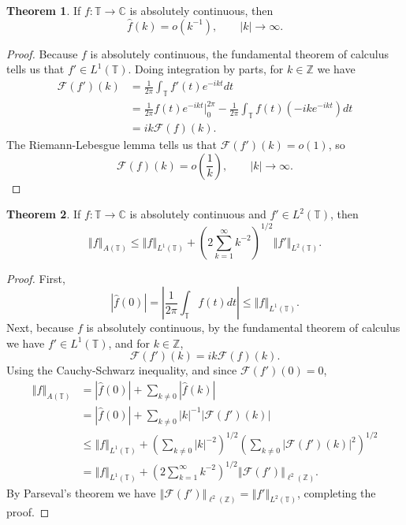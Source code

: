 \documentclass{article}
\newcommand{\norm}[1]{\left\Vert #1 \right\Vert}
\theoremstyle{definition}
\newtheorem{theorem}{Theorem}
\theoremstyle{definition}
\begin{document}
\begin{theorem}
If $f:\mathbb{T} \to \mathbb{C}$ is absolutely continuous, then
\[
\hat{f}(k) = o(k^{-1}), \qquad |k| \to \infty.
\]
\end{theorem}
\begin{proof}
Because $f$ is absolutely continuous, the fundamental theorem of calculus tells us that
$f' \in L^1(\mathbb{T})$.
Doing integration by parts, for  $k \in \mathbb{Z}$ we have
\begin{align*}
\mathscr{F}(f')(k)& = \frac{1}{2\pi} \int_{\mathbb{T}} f'(t) e^{-ikt} dt\\
&=\frac{1}{2\pi} f(t) e^{-ikt} \Big|_0^{2\pi} - \frac{1}{2\pi} \int_{\mathbb{T}} f(t) (-ik e^{-ikt}) dt\\
&=ik \mathscr{F}(f)(k).
\end{align*}
The Riemann-Lebesgue lemma tells us that $\mathscr{F}(f')(k)=o(1)$, so
\[
\mathscr{F}(f)(k) = o\left(\frac{1}{k}\right), \qquad |k| \to \infty.
\]
\end{proof}


\begin{theorem}
If $f:\mathbb{T} \to \mathbb{C}$ is absolutely continuous and $f' \in L^2(\mathbb{T})$,
then
\[
\norm{f}_{A(\mathbb{T})} \leq \norm{f}_{L^1(\mathbb{T})} +
\left(2 \sum_{k=1}^\infty k^{-2} \right)^{1/2} \norm{f'}_{L^2(\mathbb{T})}.
\]
\end{theorem}
\begin{proof}
First,
\[
|\hat{f}(0)| = \left| \frac{1}{2\pi} \int_{\mathbb{T}} f(t) dt \right|
\leq \norm{f}_{L^1(\mathbb{T})}.
\]
Next, because $f$ is absolutely continuous, by the fundamental theorem of calculus we have
$f' \in L^1(\mathbb{T})$, and  for $k \in \mathbb{Z}$,
\[
\mathscr{F}(f')(k)=ik \mathscr{F}(f)(k).
\]
Using the Cauchy-Schwarz inequality, and since $\mathscr{F}(f')(0)=0$,
\begin{align*}
\norm{f}_{A(\mathbb{T})}&=|\hat{f}(0)|+\sum_{k \neq 0} |\hat{f}(k)|\\
&=|\hat{f}(0)|+\sum_{k \neq 0} |k|^{-1} |\mathscr{F}(f')(k)|\\
&\leq \norm{f}_{L^1(\mathbb{T})} + \left( \sum_{k \neq 0} |k|^{-2} \right)^{1/2} \left( \sum_{k \neq 0} |\mathscr{F}(f')(k)|^2 \right)^{1/2}\\
&=  \norm{f}_{L^1(\mathbb{T})} + \left( 2 \sum_{k=1}^\infty k^{-2} \right)^{1/2}
\norm{\mathscr{F}(f')}_{\ell^2(\mathbb{Z})}.
\end{align*}
By Parseval's theorem we have
$\norm{\mathscr{F}(f')}_{\ell^2(\mathbb{Z})}=\norm{f'}_{L^2(\mathbb{T})}$, completing the proof.
\end{proof}
\end{document}
